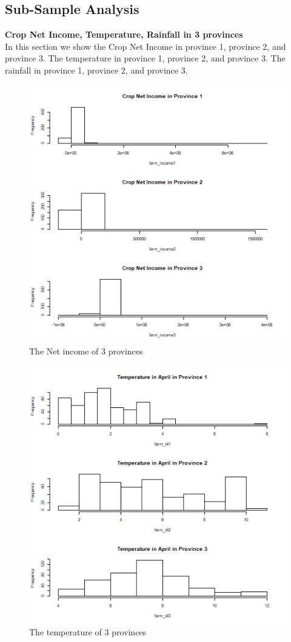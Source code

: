 \documentclass[12pt, a4paper]{article}
\begin{document}
\subsection{Sub-Sample Analysis}
\textbf{Crop Net Income, Temperature, Rainfall in 3 provinces}\\  
In this section we show the Crop Net Income in province 1, province 2, and province 3.
The temperature in province 1, province 2, and province 3.
The rainfall in province 1, province 2, and province 3.
\begin{figure}[h]
\centering
\includegraphics[scale=.5]{cropnetin.png}
\caption{The Net income of 3 provinces}
\end{figure}
\begin{figure}[h]
\centering
\includegraphics[scale=.5]{tem4.png}
\caption{The temperature of 3 provinces}
\end{figure}
\end{document}
